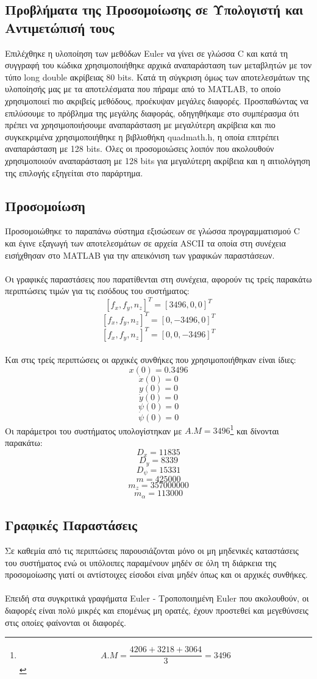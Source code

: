 \documentclass{article}
\begin{document}
\subsection{Προβλήματα της Προσομοίωσης σε Υπολογιστή και Αντιμετώπισή τους}
Επιλέχθηκε η υλοποίηση των μεθόδων Euler να γίνει σε γλώσσα C και κατά τη συγγραφή του κώδικα χρησιμοποιήθηκε αρχικά αναπαράσταση των μεταβλητών με τον τύπο long double ακρίβειας 80 bits. Κατά τη σύγκριση όμως των αποτελεσμάτων της υλοποίησής μας με τα αποτελέσματα που πήραμε από το MATLAB, το οποίο χρησιμοποιεί πιο ακριβείς μεθόδους, προέκυψαν μεγάλες διαφορές. Προσπαθώντας να επιλύσουμε το πρόβλημα της μεγάλης διαφοράς, οδηγηθήκαμε στο συμπέρασμα ότι πρέπει να χρησιμοποιήσουμε αναπαράσταση με μεγαλύτερη ακρίβεια και πιο συγκεκριμένα χρησιμοποιήθηκε η βιβλιοθήκη quadmath.h, η οποία επιτρέπει αναπαράσταση με 128 bits. Όλες οι προσομοιώσεις λοιπόν που ακολουθούν χρησιμοποιούν αναπαράσταση με 128 bits για μεγαλύτερη ακρίβεια και η αιτιολόγηση της επιλογής εξηγείται στο παράρτημα.

\subsection{Προσoμοίωση}
Προσομοιώθηκε το παραπάνω σύστημα εξισώσεων σε γλώσσα προγραμματισμού C και έγινε εξαγωγή των αποτελεσμάτων σε αρχεία ASCII τα οποία στη συνέχεια εισήχθησαν στο MATLAB για την απεικόνιση των γραφικών παραστάσεων.
\\\\
Οι γραφικές παραστάσεις που παρατίθενται στη συνέχεια, αφορούν τις τρείς παρακάτω περιπτώσεις τιμών για τις εισόδους του συστήματος:
\[[f_x, f_y, n_z]^T = [3496, 0, 0]^T\]
\[[f_x, f_y, n_z]^T = [0, -3496, 0]^T\]
\[[f_x, f_y, n_z]^T = [0, 0, -3496]^T\] 
 \\
Και στις τρείς περιπτώσεις οι αρχικές συνθήκες που χρησιμοποιήθηκαν είναι ίδιες:
\[x(0) = 0.3496\]
\[\dot{x}(0) = 0\]
\[y(0) = 0\]
\[\dot{y}(0) = 0\]
\[\psi(0) = 0\]
\[\dot{\psi}(0) = 0\]
Οι παράμετροι του συστήματος υπολογίστηκαν με \(Α.Μ = 3496\)\footnote{\[A.M = \frac{4206 + 3218 + 3064}{3} = 3496\]} και δίνονται παρακάτω:
\[D_x = 11835\]
\[D_y = 8339\]
\[D_\psi = 15331\]
\[m = 425000\]
\[m_z = 357000000\]
\[m_\alpha = 113000\]

\newpage
\subsection{Γραφικές Παραστάσεις}
Σε καθεμία από τις περιπτώσεις παρουσιάζονται μόνο οι μη μηδενικές καταστάσεις του συστήματος ενώ οι υπόλοιπες παραμένουν μηδέν σε όλη τη διάρκεια της προσομοίωσης γιατί οι αντίστοιχες είσοδοι είναι μηδέν όπως και οι αρχικές συνθήκες.
\\\\
Επειδή στα συγκριτικά γραφήματα Euler - Τροποποιημένη Euler που ακολουθούν, οι διαφορές είναι πολύ μικρές και επομένως μη ορατές, έχουν προστεθεί και μεγεθύνσεις στις οποίες φαίνονται οι διαφορές.
\end{document}
